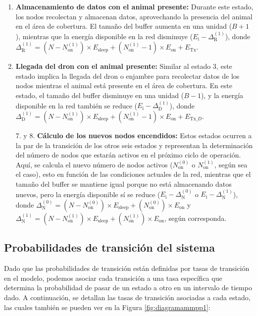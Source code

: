 \begin{enumerate}[label=\arabic*.]
    \item \textbf{Almacenamiento de datos con el animal presente:} Durante este estado, los nodos recolectan y almacenan datos, aprovechando la presencia del animal en el área de cobertura. El tamaño del buffer aumenta en una unidad ($B+1$), mientras que la energía disponible en la red disminuye ($E_{\text{i}} - \Delta_{\text{R}}^{(1)}$), donde $\Delta_{\text{R}}^{(1)} = (N - N_{\text{on}}^{(1)}) \times E_{\text{sleep}} + (N_{\text{on}}^{(1)} - 1) \times E_{\text{on}} + E_{\text{Tx}}$.
    
    \item \textbf{Llegada del dron con el animal presente:} Similar al estado 3, este estado implica la llegada del dron o enjambre para recolectar datos de los nodos mientras el animal está presente en el área de cobertura. En este estado, el tamaño del buffer disminuye en una unidad ($B-1$), y la energía disponible en la red también se reduce ($E_{\text{i}} - \Delta_{\text{D}}^{(1)}$), donde $\Delta_{\text{D}}^{(1)} = (N - N_{\text{on}}^{(1)}) \times E_{\text{sleep}} + (N_{\text{on}}^{(1)} - 1) \times E_{\text{on}} + E_{\text{Tx}\_D}$.
    
    \item[7. y 8.] \textbf{Cálculo de los nuevos nodos encendidos:} Estos estados ocurren a la par de la transición de los otros seis estados y representan la determinación del número de nodos que estarán activos en el próximo ciclo de operación. Aquí, se calcula el nuevo número de nodos activos ($N_{\text{on}}^{(0)}$ o $N_{\text{on}}^{(1)}$, según sea el caso), esto en función de las condiciones actuales de la red, mientras que el tamaño del buffer se mantiene igual porque no está almacenando datos nuevos, pero la energía disponible sí se reduce ($E_{\text{i}} - \Delta_{\text{N}}^{(0)}$ o $E_{\text{i}} - \Delta_{\text{N}}^{(1)}$), donde $\Delta_{\text{N}}^{(0)} = (N - N_{\text{on}}^{(0)}) \times E_{\text{sleep}} + (N_{\text{on}}^{(0)}) \times E_{\text{on}}$ y $\Delta_{\text{N}}^{(1)} = (N - N_{\text{on}}^{(1)}) \times E_{\text{sleep}} + (N_{\text{on}}^{(1)}) \times E_{\text{on}}$, según corresponda.
\end{enumerate}

\subsection*{Probabilidades de transición del sistema}

Dado que las probabilidades de transición están definidas por tasas de transición en el modelo, podemos asociar cada transición a una tasa específica que determina la probabilidad de pasar de un estado a otro en un intervalo de tiempo dado. A continuación, se detallan las tasas de transición asociadas a cada estado, las cuales también se pueden ver en la Figura \ref{fig:diagramammpp1}:

